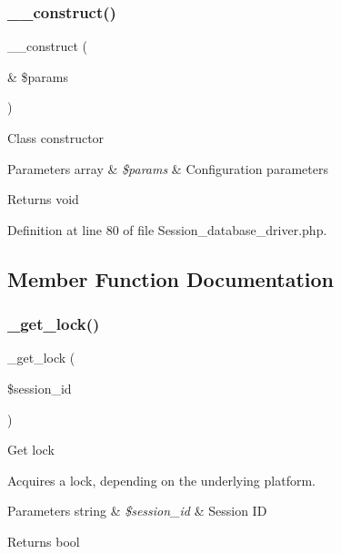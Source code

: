 \subsubsection{\texorpdfstring{\_\_construct()}{\_\_construct()}}
{\footnotesize\ttfamily \+\_\+\+\_\+construct (\begin{DoxyParamCaption}\item[{\&}]{\$params }\end{DoxyParamCaption})}

Class constructor


\begin{DoxyParams}[1]{Parameters}
array & {\em \$params} & Configuration parameters \\
\hline
\end{DoxyParams}
\begin{DoxyReturn}{Returns}
void 
\end{DoxyReturn}


Definition at line 80 of file Session\+\_\+database\+\_\+driver.\+php.



\subsection{Member Function Documentation}
\mbox{\label{class_c_i___session__database__driver_a2c49c8e23be3e2aca96a9d20de18ffc2}} 
\subsubsection{\texorpdfstring{\_get\_lock()}{\_get\_lock()}}
{\footnotesize\ttfamily \+\_\+get\+\_\+lock (\begin{DoxyParamCaption}\item[{}]{\$session\+\_\+id }\end{DoxyParamCaption})\hspace{0.3cm}{\ttfamily [protected]}}

Get lock

Acquires a lock, depending on the underlying platform.


\begin{DoxyParams}[1]{Parameters}
string & {\em \$session\+\_\+id} & Session ID \\
\hline
\end{DoxyParams}
\begin{DoxyReturn}{Returns}
bool 
\end{DoxyReturn}


